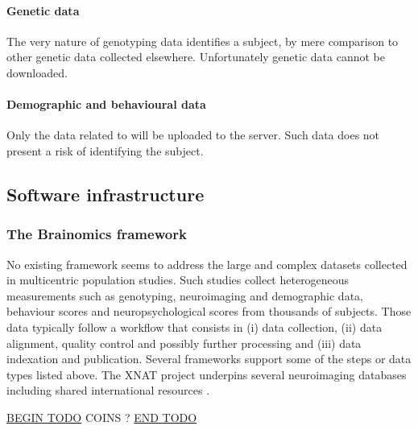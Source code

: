 \documentclass[review]{elsarticle}
\begin{document}
\paragraph{Genetic data} The very nature of genotyping data identifies a subject, by mere comparison to other genetic data collected elsewhere. Unfortunately genetic data cannot be downloaded.

\paragraph{Demographic and behavioural data} Only the data related to \cite{Pinel2007}
will be uploaded to the server. Such data does not present a risk of identifying the subject.


\subsection{Software infrastructure}

\subsubsection{The Brainomics framework}

No existing framework seems to address the large and complex datasets collected in multicentric population studies. Such studies collect heterogeneous measurements such as genotyping, neuroimaging and demographic data, behaviour scores and neuropsychological scores from thousands of subjects. Those data typically follow a workflow that consists in (i) data collection, (ii) data alignment, quality control and possibly further processing and (iii) data indexation and publication. Several frameworks support some of the steps or data types listed above. The XNAT project \cite{XNAT2007} underpins several neuroimaging databases including shared international resources \cite{HBP2012}.

\underline{BEGIN TODO}
COINS ?
\underline{END TODO}
\end{document}
